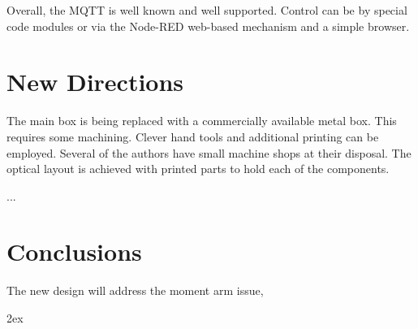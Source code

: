 \documentclass[letter,11pt,oneside]{article}
\begin{document}
Overall, the MQTT is well known and well supported. Control can
be by special code modules or via the Node-RED \cite{} web-based
mechanism and a simple browser.




\section{New Directions}

The main box is being replaced with a commercially available
metal box. This requires some machining. Clever hand tools
and additional printing can be employed. Several of the authors
have small machine shops at their disposal. The optical layout
is achieved with printed parts to hold each of the components.

...




\section{Conclusions}

The new design will address the moment arm issue, 












\begingroup
\renewcommand{\notesname}{\textcolor{red} {Action Items:}}
\parindent 0pt
\parskip 2ex
{}
\def\enotesize{\normalsize}
\theendnotes
\endgroup
\end{document}
